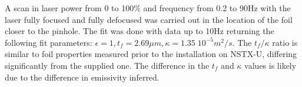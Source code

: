 
A scan in laser power from 0 to 100\% and frequency from 0.2 to 90Hz with the laser fully focused and fully defocused was carried out in the location of the foil closer to the pinhole. The fit was done with data up to 10Hz returning the following fit parameters: ${\epsilon=1}, {t_f=2.69\mu m}, {\kappa=1.35\;10^{-5}m^2/s}$. The $t_f / \kappa$ ratio is similar to foil properties measured prior to the installation on NSTX-U, differing significantly from the supplied one.\cite{Reinke2018} The difference in the $t_f$ and $\kappa$ values is likely due to the difference in emissivity inferred.

